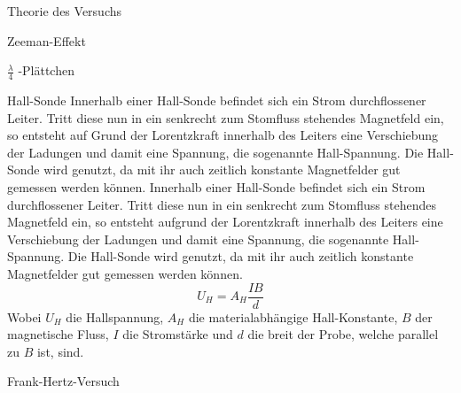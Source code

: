 \documentclass[pdftex, a4paper,11pt, twoside, ngerman]{report}
\begin{document}
\begin{chapter}{Theorie des Versuchs}
\begin{section}{Zeeman-Effekt}
\begin{subsection}{$\frac{\lambda}{4}$ -Plättchen}
      \end{subsection}
      
      
      
      \begin{subsection}{Hall-Sonde}
        Innerhalb einer Hall-Sonde befindet sich ein Strom durchflossener
        Leiter. Tritt diese nun in ein senkrecht zum Stomfluss stehendes
        Magnetfeld ein, so entsteht auf Grund der Lorentzkraft innerhalb des
        Leiters eine Verschiebung der Ladungen und damit eine Spannung, die
        sogenannte Hall-Spannung. Die Hall-Sonde wird genutzt, da mit ihr auch
        zeitlich konstante Magnetfelder gut gemessen werden können.
        Innerhalb einer Hall-Sonde befindet sich ein Strom durchflossener
        Leiter. Tritt diese nun in ein senkrecht zum Stomfluss stehendes
        Magnetfeld ein, so entsteht aufgrund der Lorentzkraft innerhalb des
        Leiters eine Verschiebung der Ladungen und damit eine Spannung, die
        sogenannte Hall-Spannung. Die Hall-Sonde wird genutzt, da mit ihr auch
        zeitlich konstante Magnetfelder gut gemessen werden können.
        \begin{equation}
          \label{eq:Hallsonde}
          U_H = A_H\frac{IB}{d}
        \end{equation}
        Wobei $U_H$ die Hallspannung, $A_H$ die materialabhängige
        Hall-Konstante, $B$ der magnetische Fluss, $I$ die Stromstärke und $d$
        die breit der Probe, welche parallel zu $B$ ist, sind.
        \cite{bib:Hallsonde}
      \end{subsection}
      
    \end{section}
    
    
    
    \begin{section}{Frank-Hertz-Versuch}
      
      
      

\end{section}
\end{chapter}
\end{document}

